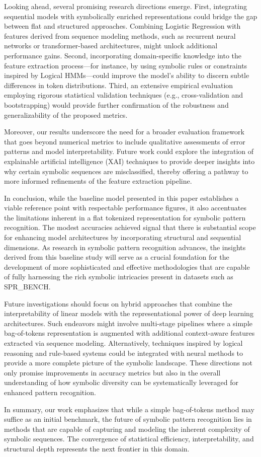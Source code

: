 \documentclass{article}
\begin{document}
Looking ahead, several promising research directions emerge. First, integrating sequential models with symbolically enriched representations could bridge the gap between flat and structured approaches. Combining Logistic Regression with features derived from sequence modeling methods, such as recurrent neural networks or transformer-based architectures, might unlock additional performance gains. Second, incorporating domain-specific knowledge into the feature extraction process—for instance, by using symbolic rules or constraints inspired by Logical HMMs—could improve the model’s ability to discern subtle differences in token distributions. Third, an extensive empirical evaluation employing rigorous statistical validation techniques (e.g., cross-validation and bootstrapping) would provide further confirmation of the robustness and generalizability of the proposed metrics.

Moreover, our results underscore the need for a broader evaluation framework that goes beyond numerical metrics to include qualitative assessments of error patterns and model interpretability. Future work could explore the integration of explainable artificial intelligence (XAI) techniques to provide deeper insights into why certain symbolic sequences are misclassified, thereby offering a pathway to more informed refinements of the feature extraction pipeline.

In conclusion, while the baseline model presented in this paper establishes a viable reference point with respectable performance figures, it also accentuates the limitations inherent in a flat tokenized representation for symbolic pattern recognition. The modest accuracies achieved signal that there is substantial scope for enhancing model architectures by incorporating structural and sequential dimensions. As research in symbolic pattern recognition advances, the insights derived from this baseline study will serve as a crucial foundation for the development of more sophisticated and effective methodologies that are capable of fully harnessing the rich symbolic intricacies present in datasets such as SPR\_BENCH.
  
Future investigations should focus on hybrid approaches that combine the interpretability of linear models with the representational power of deep learning architectures. Such endeavors might involve multi-stage pipelines where a simple bag-of-tokens representation is augmented with additional context-aware features extracted via sequence modeling. Alternatively, techniques inspired by logical reasoning and rule-based systems could be integrated with neural methods to provide a more complete picture of the symbolic landscape. These directions not only promise improvements in accuracy metrics but also in the overall understanding of how symbolic diversity can be systematically leveraged for enhanced pattern recognition.

In summary, our work emphasizes that while a simple bag-of-tokens method may suffice as an initial benchmark, the future of symbolic pattern recognition lies in methods that are capable of capturing and modeling the inherent complexity of symbolic sequences. The convergence of statistical efficiency, interpretability, and structural depth represents the next frontier in this domain.
\end{document}
